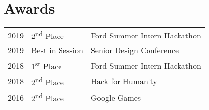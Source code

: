 \documentclass[]{deedy-resume-openfont}
\begin{document}
\begin{minipage}[t]{0.66\textwidth}



\section{Awards} 
\begin{tabular}{rll}
2019	     & 2\textsuperscript{nd} Place  & Ford Summer Intern Hackathon\\
2019	     & Best in Session & Senior Design Conference\\
2018	     & 1\textsuperscript{st} Place  & Ford Summer Intern Hackathon\\
2018	     & 2\textsuperscript{nd} Place  & Hack for Humanity\\
2016	     & 2\textsuperscript{nd} Place  & Google Games\\
\end{tabular}
\sectionsep

\sectionsep


%
%

\end{minipage} 
\hfill
\end{document}
